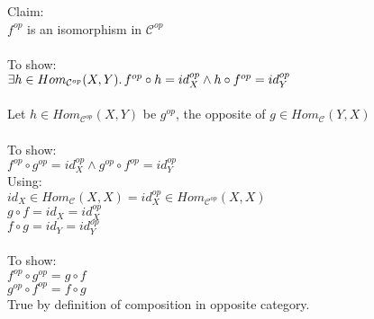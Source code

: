 \documentclass[a4paper, twoside, english, 11pt]{book}
\newcommand{\C}{\mathcal C}
\begin{document}
\noindent
Claim: \\

$f^{op}$ is an isomorphism in $\C^{op}$ \\\\

\noindent
To show: \\

$\exists h \in Hom_{\C^{op}}(X, Y) \ldotp f^{op} \circ h = id_X^{op} \land h \circ f^{op} = id_Y^{op}$ \\\\

\noindent
Let $h \in Hom_{\C^{op}}(X, Y)$ be $g^{op}$, the opposite of $g \in Hom_\C(Y, X)$ \\\\

\noindent
To show: \\

$f^{op} \circ g^{op} = id_X^{op} \land g^{op} \circ f^{op} = id_Y^{op}$ \\

\noindent
Using: \\

$id_X \in Hom_\C(X, X) = id_X^{op} \in Hom_{\C^{op}}(X, X)$ \\

$g \circ f = id_X = id_X^{op}$ \\
\indent
$f \circ g = id_Y = id_Y^{op}$ \\\\

\noindent
To show: \\

$f^{op} \circ g^{op} = g \circ f$ \\
\indent
$g^{op} \circ f^{op} = f \circ g$ \\

\noindent
True by definition of composition in opposite category.
\end{document}
